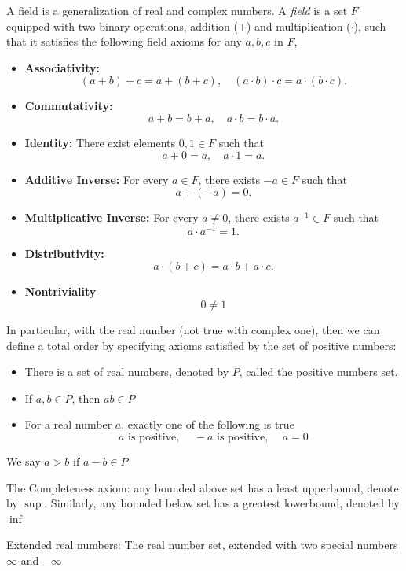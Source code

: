 
A field is a generalization of real and complex numbers. A \emph{field} is a set \( F \) equipped with two binary operations, addition (\(+\)) and multiplication (\(\cdot\)),
such that it satisfies the following field axioms for any $a, b, c$ in $F$,


\begin{itemize}
    \item \textbf{Associativity:} 
    \[
    (a + b) + c = a + (b + c), \quad (a \cdot b) \cdot c = a \cdot (b \cdot c).
    \]
    \item \textbf{Commutativity:} 
    \[
    a + b = b + a, \quad a \cdot b = b \cdot a.
    \]
    \item \textbf{Identity:} There exist elements \( 0, 1 \in F \) such that
    \[
    a + 0 = a, \quad a \cdot 1 = a.
    \]
    \item \textbf{Additive Inverse:} For every \( a \in F \), there exists \( -a \in F \) such that
    \[
    a + (-a) = 0.
    \]
    \item \textbf{Multiplicative Inverse:} For every \( a \neq 0 \), there exists \( a^{-1} \in F \) such that
    \[
    a \cdot a^{-1} = 1.
    \]
    \item \textbf{Distributivity:} 
    \[
    a \cdot (b + c) = a \cdot b + a \cdot c.
    \]
    \item \textbf{Nontriviality}
    \[0\neq 1\]
\end{itemize}

In particular, with the real number (not true with complex one), then we can define a total order by specifying axioms satisfied by the set of positive numbers:
\begin{itemize}
    \item There is a set of real numbers, denoted by $P$, called the positive numbers set.
    \item If $a, b \in P$, then $ab \in P$
    \item For a real number $a$, exactly one of the following is true
        \begin{equation*}
            a \text{ is positive, } \quad -a \text{ is positive, } \quad a =0
        \end{equation*}
\end{itemize}
We say $a>b$ if $a-b\in P$

The Completeness axiom: any bounded above set has a least upperbound, denote by $\sup$. Similarly, any bounded below set has a greatest lowerbound, denoted by $\inf$

Extended real numbers: The real number set, extended with two special numbers $\infty$ and $-\infty$


